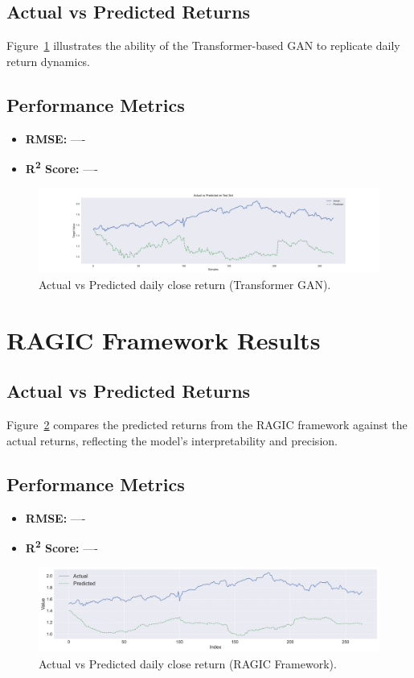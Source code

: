 \subsection{Actual vs Predicted Returns}
Figure~\ref{fig:tgan_actual_vs_pred} illustrates the ability of the Transformer-based GAN to replicate daily return dynamics.

\subsection{Performance Metrics}
\begin{itemize}
    \item \textbf{RMSE:} ----
    \item \textbf{R\textsuperscript{2} Score:} ----
\end{itemize}

\begin{figure}[h!]
    \centering
    \includegraphics[width=\textwidth]{Images/_8_ActualVsPred_c.pdf}
    \caption{Actual vs Predicted daily close return (Transformer GAN).}
    \label{fig:tgan_actual_vs_pred}
\end{figure}

\section{RAGIC Framework Results}
\subsection{Actual vs Predicted Returns}
Figure~\ref{fig:ragic_actual_vs_pred} compares the predicted returns from the RAGIC framework against the actual returns, reflecting the model’s interpretability and precision.

\subsection{Performance Metrics}
\begin{itemize}
    \item \textbf{RMSE:} ----
    \item \textbf{R\textsuperscript{2} Score:} ----
\end{itemize}

\begin{figure}[h!]
    \centering
    \includegraphics[width=\textwidth]{Images/9_Act_vs_Pred_Point.pdf}
    \caption{Actual vs Predicted daily close return (RAGIC Framework).}
    \label{fig:ragic_actual_vs_pred}
\end{figure}

